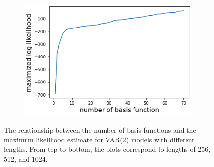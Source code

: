 \documentclass[%
 reprint,
 amsmath,amssymb,
 aps,
]{revtex4-2}
\begin{document}
\begin{figure}
\begin{subfigure}{\textwidth} %
  \centering
  \includegraphics[width=10cm]{num basis funs vs mle var2 1024.png}
\end{subfigure}
\caption{The relationship between the number of basis functions and the maximum likelihood estimate for VAR(2) models with different lengths. From top to bottom, the plots correspond to lengths of 256, 512, and 1024.}
\label{var2 basis funs vs mle}
\end{figure}
\end{document}
